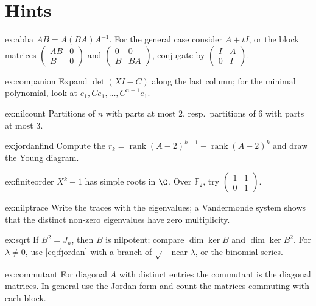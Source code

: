 \section{Hints}

\begin{hint}{ex:abba}
$AB=A(BA)A^{-1}$. For the general case consider $A+tI$, or the block matrices $\begin{pmatrix}AB&0\\B&0\end{pmatrix}$ and
$\begin{pmatrix}0&0\\B&BA\end{pmatrix}$, conjugate by $\begin{pmatrix}I&A\\0&I\end{pmatrix}$.
\end{hint}
\begin{hint}{ex:companion}
Expand $\det(XI-C)$ along the last column; for the minimal polynomial, look at $e_1,Ce_1,\dots,C^{n-1}e_1$.
\end{hint}
\begin{hint}{ex:nilcount}
Partitions of $n$ with parts at most $2$, resp.\ partitions of $6$ with parts at most $3$.
\end{hint}
\begin{hint}{ex:jordanfind}
Compute the $r_k=\operatorname{rank}(A-2)^{k-1}-\operatorname{rank}(A-2)^k$ and draw the Young diagram.
\end{hint}
\begin{hint}{ex:finiteorder}
$X^k-1$ has simple roots in $\C$. Over $\mathbb F_2$, try $\begin{pmatrix}1&1\\0&1\end{pmatrix}$.
\end{hint}
\begin{hint}{ex:nilptrace}
Write the traces with the eigenvalues; a Vandermonde system shows that the distinct non-zero eigenvalues have zero
multiplicity.
\end{hint}
\begin{hint}{ex:sqrt}
If $B^2=J_n$, then $B$ is nilpotent; compare $\dim\ker B$ and $\dim\ker B^2$. For $\lambda\ne0$, use \eqref{eq:fjordan} with a
branch of $\sqrt{\phantom{x}}$ near $\lambda$, or the binomial series.
\end{hint}
\begin{hint}{ex:commutant}
For diagonal $A$ with distinct entries the commutant is the diagonal matrices. In general use the Jordan form and count
the matrices commuting with each block.
\end{hint}
